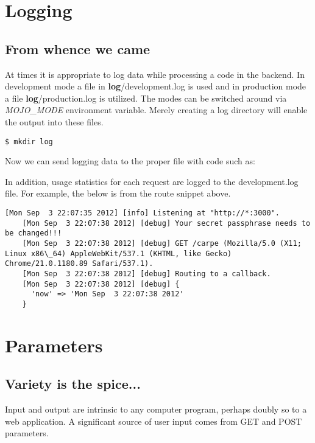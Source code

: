 \documentclass[17pt]{extreport}
\begin{document}
\section{Logging}

\subsection{From whence we came}

At times it is appropriate to log data while processing a code in the backend.
In development mode a file in \textbf{log}/development.log is used and in production
mode a file \textbf{log}/production.log is utilized. The modes can be switched around
via \textit{MOJO\_MODE} environment variable. Merely creating a log directory will enable
the output into these files.

\begin{lstlisting}[style=BashInputStyle]
$ mkdir log
\end{lstlisting}

Now we can send logging data to the proper file with code such as:



In addition, usage statistics for each request are logged to the
development.log file.  For example, the below is from the route snippet above.

\begin{lstlisting}[style=BashOutputStyle]
    [Mon Sep  3 22:07:35 2012] [info] Listening at "http://*:3000".
    [Mon Sep  3 22:07:38 2012] [debug] Your secret passphrase needs to be changed!!!
    [Mon Sep  3 22:07:38 2012] [debug] GET /carpe (Mozilla/5.0 (X11; Linux x86\_64) AppleWebKit/537.1 (KHTML, like Gecko) Chrome/21.0.1180.89 Safari/537.1).
    [Mon Sep  3 22:07:38 2012] [debug] Routing to a callback.
    [Mon Sep  3 22:07:38 2012] [debug] {
      'now' => 'Mon Sep  3 22:07:38 2012'
    }
\end{lstlisting}

\section{Parameters}

\subsection{Variety is the spice...}

Input and output are intrinsic to any computer program, perhaps doubly so to a
web application.  A significant source of user input comes from GET and POST
parameters.
\end{document}
